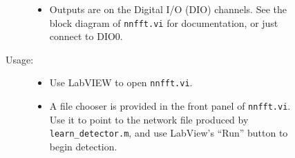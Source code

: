 \documentclass[10pt,letterpaper]{article}
\begin{document}
\begin{description}
\begin{description}
\begin{description}
\begin{itemize}
      \item Outputs are on the Digital I/O (DIO) channels.  See the block diagram of {\tt nnfft.vi} for documentation, or just connect to DIO0.
      \end{itemize}
    \item[Usage:]\hfill
      \begin{itemize}
      \item Use LabVIEW to open {\tt nnfft.vi}.
        \item A file chooser is provided in the front panel of {\tt nnfft.vi}.  Use it to point to the network file
      produced by {\tt learn\_detector.m}, and use LabView's ``Run''
      button to begin detection.
      \end{itemize}
    \end{description}
  \end{description}
  
\end{description}
\end{document}
